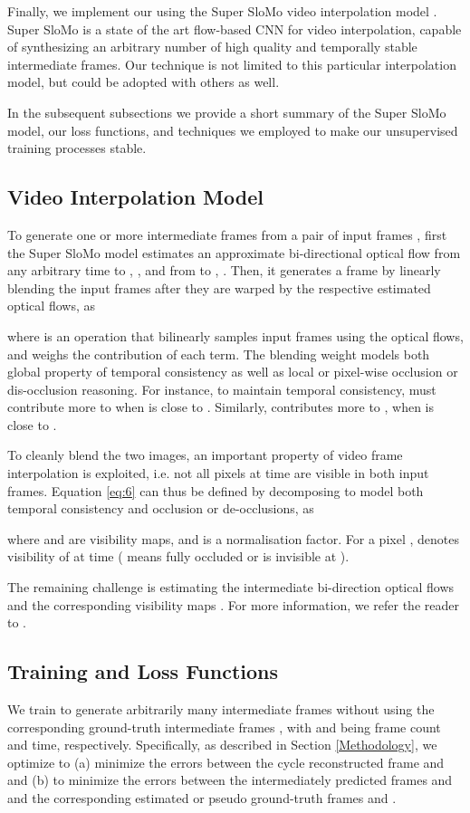 \documentclass[10pt,twocolumn,letterpaper]{article}
\begin{document}
Finally, we implement our  using the Super SloMo video interpolation model \cite{jiang2018super}. Super SloMo is a state of the art flow-based CNN for video interpolation, capable of synthesizing an arbitrary number of high quality and temporally stable intermediate frames. Our technique is not limited to this particular interpolation model, but could be adopted with others as well.

In the subsequent subsections we provide a short summary of the Super SloMo model, our loss functions, and techniques we employed to make our unsupervised training processes stable.

\subsection{Video Interpolation Model}
To generate one or more intermediate frames  from a pair of input frames , first the Super SloMo model estimates an approximate bi-directional optical flow from any arbitrary time  to , , and from  to , . Then, it generates a frame by linearly blending the input frames after they are warped by the respective estimated optical flows, as


\noindent where  is an operation that bilinearly samples input frames using the optical flows, and  weighs the contribution of each term. The blending weight  models both global property of temporal consistency as well as local or pixel-wise occlusion or dis-occlusion reasoning. For instance, to maintain temporal consistency,  must contribute more to  when  is close to . Similarly,  contributes more to , when  is close to . 

To cleanly blend the two images, an important property of video frame interpolation is exploited, i.e. not all pixels at time  are visible in both input frames. Equation \ref{eq:6} can thus be defined by decomposing  to model both temporal consistency and occlusion or de-occlusions, as

\noindent where  and  are visibility maps, and  is a normalisation factor. For a pixel ,   denotes visibility of  at time  ( means fully occluded or is invisible at ). 

The remaining challenge is estimating the intermediate bi-direction optical flows  and the corresponding visibility maps . For more information, we refer the reader to \cite{jiang2018super}.

\subsection{Training and Loss Functions}
We train  to generate arbitrarily many intermediate frames  without using the corresponding ground-truth intermediate frames , with  and  being frame count and time, respectively. Specifically, as described in Section \ref{Methodology}, we optimize  to (a) minimize the errors between the cycle reconstructed frame  and  and (b) to minimize the errors between the intermediately predicted frames  and  and the corresponding estimated or pseudo ground-truth frames  and . 
\end{document}
